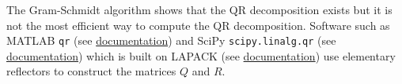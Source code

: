 \begin{note}
The Gram-Schmidt algorithm shows that the QR decomposition exists but it is not the most efficient way to compute the QR decomposition. Software such as MATLAB {\tt qr} (see \href{https://www.mathworks.com/help/matlab/ref/qr.html}{documentation}) and SciPy {\tt scipy.linalg.qr} (see \href{https://docs.scipy.org/doc/scipy/reference/generated/scipy.linalg.qr.html}{documentation}) which is built on LAPACK (see \href{https://www.netlib.org/lapack/lug/node128.html#secorthog}{documentation}) use elementary reflectors to construct the matrices $Q$ and $R$.
\end{note}